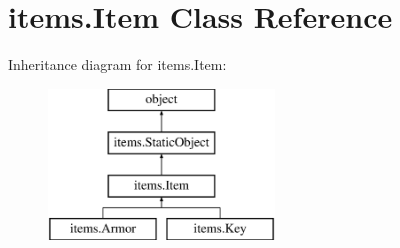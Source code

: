 \hypertarget{classitems_1_1_item}{}\section{items.\+Item Class Reference}
\label{classitems_1_1_item}
Inheritance diagram for items.\+Item\+:\begin{figure}[H]
\begin{center}
\leavevmode
\includegraphics[height=4.000000cm]{classitems_1_1_item}
\end{center}
\end{figure}
